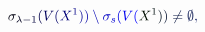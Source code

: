 \documentclass[12pt]{article}
\begin{document}
\makeatletter
\renewcommand*{\@textcolor}[3]{%
  \protect\leavevmode
  \begingroup
    \color#1{#2}#3%
  \endgroup
}
\makeatother
\begin{displaymath}
\mathcolor[RGB]{0,0,15}{\sigma} _ { \mathcolor[RGB]{0,0,30}{\lambda} \mathcolor[RGB]{0,0,45}{-} \mathcolor[RGB]{0,0,60}{1} } \mathcolor[RGB]{0,0,75}{(} \mathcolor[RGB]{0,0,90}{V} \mathcolor[RGB]{0,0,105}{(} \mathcolor[RGB]{0,0,120}{X} ^ { \mathcolor[RGB]{0,0,135}{1} } \mathcolor[RGB]{0,0,150}{)} \mathcolor[RGB]{0,0,165}{)} \mathcolor[RGB]{0,0,180}{\setminus} \mathcolor[RGB]{0,0,195}{\sigma} _ { \mathcolor[RGB]{0,0,210}{s} } \mathcolor[RGB]{0,0,225}{(} \mathcolor[RGB]{0,0,240}{V} \mathcolor[RGB]{0,0,255}{(} \mathcolor[RGB]{0,15,0}{X} ^ { \mathcolor[RGB]{0,15,15}{1} } \mathcolor[RGB]{0,15,30}{)} \mathcolor[RGB]{0,15,45}{)} \mathcolor[RGB]{0,15,60}{\neq} \mathcolor[RGB]{0,15,75}{\emptyset} \mathcolor[RGB]{0,15,90}{,}
\end{displaymath}
\end{document}
